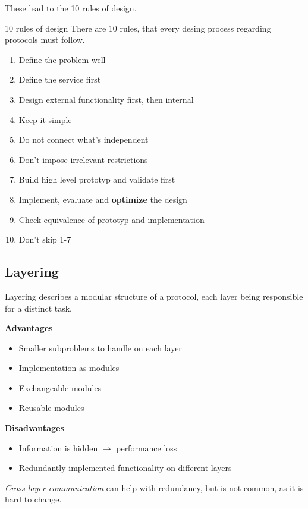 \documentclass[english]{panikzettel}
\begin{document}
	These lead to the 10 rules of design.

	\begin{defi}{10 rules of design}
		There are 10 rules, that every desing process regarding protocols must follow.
		\tcblower
		\begin{enumerate}
			\item Define the problem well
			\item Define the service first
			\item Design external functionality first, then internal
			\item Keep it simple
			\item Do not connect what's independent
			\item Don't impose irrelevant restrictions
			\item Build high level prototyp and validate first
			\item Implement, evaluate and \textbf{optimize} the design
			\item Check equivalence of prototyp and implementation
			\item Don't skip 1-7
		\end{enumerate}
	\end{defi}
	
	\subsection{Layering}
	\label{ss-layering}

	Layering describes a modular structure of a protocol, each layer being responsible for a distinct task.

	\begin{halfboxl}
		\textbf{Advantages}
		\begin{itemize}
			\item Smaller subproblems to handle on each layer
			\item Implementation as modules
			\item Exchangeable modules
			\item Reusable modules
		\end{itemize}
	\end{halfboxl}%
 	\begin{halfboxr}
		\vspace{-\baselineskip}
 		\textbf{Disadvantages}
		\begin{itemize}
			\item Information is hidden \( \rightarrow \) performance loss
			\item Redundantly implemented functionality on different layers
		\end{itemize}
 	\end{halfboxr}

	\textit{Cross-layer communication} can help with redundancy, but is not common, as it is hard to change. 
\end{document}
